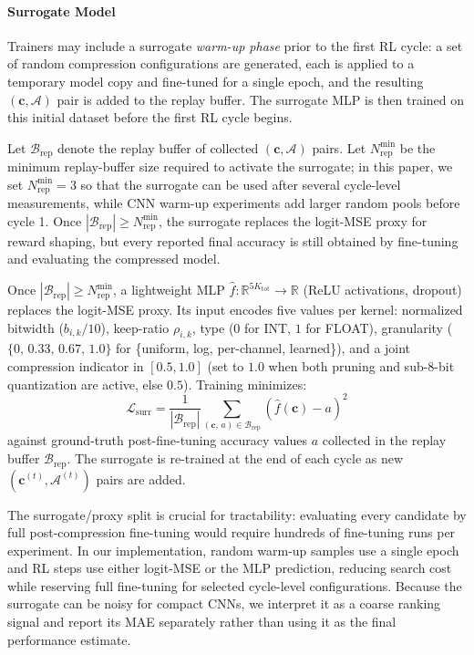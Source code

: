 \documentclass[preprint,12pt,authoryear]{elsarticle}
\begin{document}
\paragraph{Surrogate Model}
Trainers may include a surrogate \emph{warm-up phase} prior to the
first RL cycle: a set of random compression configurations are generated, each is applied
to a temporary model copy and fine-tuned for a single epoch, and the resulting
$(\mathbf{c}, \mathcal{A})$ pair is added to the replay buffer. The surrogate MLP is
then trained on this initial dataset before the first RL cycle begins.

Let $\mathcal{B}_{\mathrm{rep}}$ denote the replay buffer of collected $(\mathbf{c}, \mathcal{A})$ pairs.
Let $N_{\mathrm{rep}}^{\min}$ be the minimum replay-buffer size required to activate the
surrogate; in this paper, we set $N_{\mathrm{rep}}^{\min}=3$ so that the surrogate can be
used after several cycle-level measurements, while CNN warm-up experiments add larger
random pools before cycle 1. Once $|\mathcal{B}_{\mathrm{rep}}| \geq N_{\mathrm{rep}}^{\min}$,
the surrogate replaces the logit-MSE proxy for reward shaping, but every reported final
accuracy is still obtained by fine-tuning and evaluating the compressed model.

Once $|\mathcal{B}_{\mathrm{rep}}| \geq N_{\mathrm{rep}}^{\min}$, a lightweight MLP
$\hat{f}: \mathbb{R}^{5K_{\mathrm{tot}}} \to \mathbb{R}$ (ReLU activations, dropout) replaces the
logit-MSE proxy. Its input encodes five values per kernel: normalized bitwidth
($b_{i,k}/10$), keep-ratio $\rho_{i,k}$, type ($0$ for INT, $1$ for FLOAT),
granularity ($\{0,\,0.33,\,0.67,\,1.0\}$ for \{uniform, log, per-channel, learned\}),
and a joint compression indicator in $[0.5, 1.0]$ (set to $1.0$ when both pruning and
sub-8-bit quantization are active, else $0.5$). Training minimizes:
\begin{equation}
    \mathcal{L}_{\mathrm{surr}} =
    \frac{1}{|\mathcal{B}_{\mathrm{rep}}|}
    \sum_{(\mathbf{c},\, a) \in \mathcal{B}_{\mathrm{rep}}}
    \left(\hat{f}(\mathbf{c}) - a\right)^2
    \label{eq:surrogate_loss}
\end{equation}
against ground-truth post-fine-tuning accuracy values $a$ collected in the
replay buffer $\mathcal{B}_{\mathrm{rep}}$. The surrogate is re-trained at the end of
each cycle as new $(\mathbf{c}^{(t)}, \mathcal{A}^{(t)})$ pairs are added.

The surrogate/proxy split is crucial for tractability: evaluating every candidate by full
post-compression fine-tuning would require hundreds of fine-tuning runs per experiment.
In our implementation, random warm-up samples use a single epoch and RL steps use either
logit-MSE or the MLP prediction, reducing search cost while reserving full fine-tuning for
selected cycle-level configurations. Because the surrogate can be noisy for compact CNNs,
we interpret it as a coarse ranking signal and report its MAE separately rather than using
it as the final performance estimate.
\end{document}
